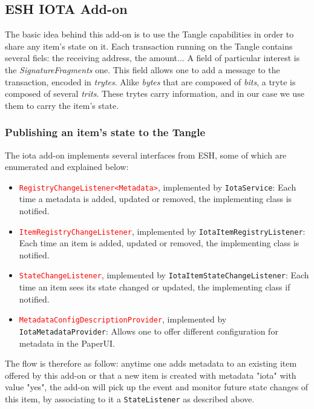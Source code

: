 \documentclass[a4paper,10pt]{article}
\begin{document}
\subsection{ESH IOTA Add-on}

The basic idea behind this add-on is to use the Tangle capabilities in order to share any item's state on it. Each transaction running on the Tangle contains several fiels: the receiving address, the amount... A field of particular interest is the \textit{SignatureFragments} one. This field allows one to add a message to the transaction, encoded in \textit{trytes}. Alike \textit{bytes} that are composed of \textit{bits}, a tryte is composed of several \textit{trits}. These trytes carry information, and in our case we use them to carry the item's state.

\subsubsection{Publishing an item's state to the Tangle}


The iota add-on implements several interfaces from ESH, some of which are enumerated and explained below:

\begin{itemize}
	\item \texttt{\textcolor{red}{RegistryChangeListener<Metadata>}}, implemented by \texttt{\textcolor{OliveGreen}{IotaService}}: Each time a metadata is added, updated or removed, the implementing class is notified.
	\item \texttt{\textcolor{red}{ItemRegistryChangeListener}}, implemented by \texttt{\textcolor{OliveGreen}{IotaItemRegistryListener}}: Each time an item is added, updated or removed, the implementing class is notified.
	\item \texttt{\textcolor{red}{StateChangeListener}}, implemented by \texttt{\textcolor{OliveGreen}{IotaItemStateChangeListener}}: Each time an item sees its state changed or updated, the implementing class if notified. 
	\item \texttt{\textcolor{red}{MetadataConfigDescriptionProvider}}, implemented by \texttt{\textcolor{OliveGreen}{IotaMetadataProvider}}: Allows one to offer different configuration for metadata in the PaperUI.
\end{itemize}

\noindent The flow is therefore as follow: anytime one adds metadata to an existing item offered by this add-on or that a new item is created with metadata "iota" with value "yes", the add-on will pick up the event and monitor future state changes of this item, by associating to it a \texttt{StateListener} as described above. \\
\end{document}
